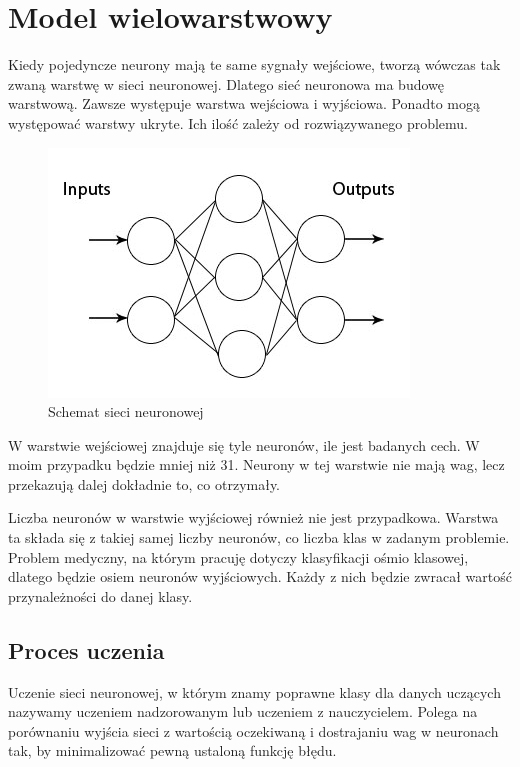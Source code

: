    \section{Model wielowarstwowy}\label{sec:modelWielowarstwowy}

    Kiedy pojedyncze neurony mają te same sygnały wejściowe, tworzą wówczas tak zwaną warstwę w sieci neuronowej.
    Dlatego sieć neuronowa ma budowę warstwową.
    Zawsze występuje warstwa wejściowa i wyjściowa.
    Ponadto mogą występować warstwy ukryte.
    Ich ilość zależy od rozwiązywanego problemu.

    \begin{figure}[htp]
        \centering
        \includegraphics[scale=0.9]{./img/mlp.jpg}
        \caption{Schemat sieci neuronowej}
    \end{figure}

    W warstwie wejściowej znajduje się tyle neuronów, ile jest badanych cech.
    W moim przypadku będzie mniej niż 31.
    Neurony w tej warstwie nie mają wag, lecz przekazują dalej dokładnie to, co otrzymały.

    Liczba neuronów w warstwie wyjściowej również nie jest przypadkowa.
    Warstwa ta składa się z takiej samej liczby neuronów, co liczba klas w zadanym problemie.
    Problem medyczny, na którym pracuję dotyczy klasyfikacji ośmio klasowej, dlatego będzie osiem neuronów wyjściowych.
    Każdy z nich będzie zwracał wartość przynależności do danej klasy.

    \subsection{Proces uczenia}\label{subsec:procesUczenia}

    Uczenie sieci neuronowej, w którym znamy poprawne klasy dla danych uczących nazywamy uczeniem nadzorowanym lub uczeniem z nauczycielem.
    Polega na porównaniu wyjścia sieci z wartością oczekiwaną i dostrajaniu wag w neuronach tak, by minimalizować pewną ustaloną funkcję błędu.

